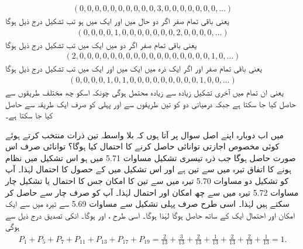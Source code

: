 \begin{align}
	(0, 0, 0, 0, 0, 0, 0, 0, 0, 0, 3, 0, 0, 0, 0, 0, 0, 0, \dots)
\end{align} 
یعنی  باقی تمام صفر اگر دو حال  میں اور ایک  میں ہو تب تشکیل  درج ذیل ہوگا
\begin{align}
	(0, 0, 0, 0, 1, 0, 0, 0, 0, 0, 0, 0, 2, 0, 0, 0, 0, \dots)
\end{align}  
یعنی  باقی تمام صفر اگر دو  میں ایک  میں تب تشکیل  درج ذیل ہوگا
\begin{align}
	(2, 0, 0, 0, 0, 0, 0, 0, 0, 0, 0, 0, 0, 0, 0, 0, 0, 0, 1, 0, \dots)
\end{align} 
یعنی باقی تمام صفر اور اگر ایک ذرہ  میں ایک  میں اور ایک  میں تب تشکیل  درج ذیل ہوگا 
\begin{align}
	(0, 0, 0, 0, 1, 0, 1, 0, 0, 0, 0, 0, 0, 0, 0, 0, 1, 0, 0, \dots)
\end{align} 
یعنی  ان تمام میں آخری تشکیل  زیادہ سے زیادہ محتمل ہوگی چونکہ اسکو چھ مختلف طریقوں سے حاصل کیا جا سکتا ہے جبکہ درمیانی دو کو تین طریقوں سے اور پہلی کو صرف ایک طریقہ سے حاصل کیا جا سکتا ہے۔

میں اب دوبارہ اپنے اصل سوال پر آتا ہوں کہ بلا واسطہ تین ذرات منتخب کرتے ہوئے کوئی مخصوص اجازتی توانائی  حاصل کرنے کا احتمال  کیا ہوگا؟ توانائی  صرف اس صورت حاصل ہوگا جب ذرہ تیسری تشکیل مساوات \num{5.71} میں ہو اس تشکیل میں نظام ہونے کا اتفاق تیرہ میں سے تین ہے اور اس تشکیل میں  کے حصول کا احتمال  لہٰذا۔ آپ  کو تشکیل دو مساوات \num{5.70} تیرہ میں سے تین کا امکان جس کا احتمال  	یا تشکیل چار مساوات \num{5.72} تیرہ میں سے چھ امکان اور احتمال  لہٰذا۔ آپ  کو صرف چار سے حاصل کر سکتے ہیں لہٰذا۔ اسی طرح  صرف پہلی تشکیل سے مساوات \num{5.69} سے تیرہ میں سے ایک امکان اور احتمال ایک کے ساتھ حاصل ہوگا لہٰذا ہوگا۔ اسی طرح ،  اور  ہوگا۔ انکی تصدیق درج ذیل سے ہوگی 
\begin{align*}
	P_1 + P_5 + P_7 + P_{11} + P_{13} + P_{17} + P_{19} = \frac{2}{13} + \frac{3}{13} + \frac{2}{13} + \frac{1}{13} + \frac{2}{13} + \frac{2}{13} + \frac{1}{13} = 1.
\end{align*} 

